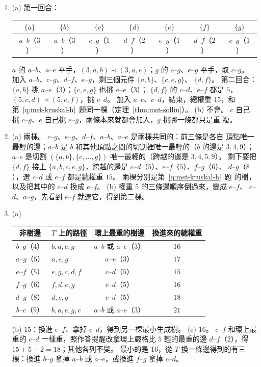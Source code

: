 \begin{enumerate}
\item (a) 第一回合：
\begin{center}
\small
\begin{tabular}{ccccccc}
\toprule
$\{a\}$ & $\{b\}$ & $\{c\}$ & $\{d\}$ & $\{e\}$ & $\{f\}$ & $\{g\}$ \\
\midrule
$a$--$b$（$3$） & $a$--$b$（$3$） & $c$--$g$（$1$） & $d$--$f$（$2$） & $e$--$g$（$1$） & $d$--$f$（$2$） &
$c$--$g$（$1$） \\
\bottomrule
\end{tabular}
\end{center}
$a$ 的 $a$--$b$、$a$--$e$ 平手，$(3, a, b) \prec (3, a, e)$；$g$ 的 $c$--$g$、$e$--$g$ 平手，取
$c$--$g$。 加入 $a$--$b$、$c$--$g$、$d$--$f$、$e$--$g$，剩三個元件 $\{a, b\}$、$\{c, e, g\}$、
$\{d, f\}$。 第二回合：$\{a, b\}$ 挑 $a$--$e$（$3$）；$\{c, e, g\}$ 也挑 $a$--$e$（$3$）；
$\{d, f\}$ 的 $c$--$d$、$e$--$f$ 都是 $5$，$(5, c, d) \prec (5, e, f)$，挑 $c$--$d$。 加入
$a$--$e$、$c$--$d$，結束，總權重 $15$，和第~\ref{q:mst-kruskal-h}~題同一棵（定理~\ref{thm:mst-sollin}）。
(b) 不會。 $c$ 自己挑 $c$--$g$、$e$ 自己挑 $e$--$g$，兩條本來就都會加入，$g$ 挑哪一條都只是重
複。

\item (a) 兩棵。 $c$--$g$、$e$--$g$、$d$--$f$、$a$--$b$、$a$--$e$ 是兩棵共同的：前三條是各自
頂點唯一最輕的邊；$a$--$b$ 是 $b$ 和其他頂點之間的切割裡唯一最輕的（$b$ 的邊是 $3, 4, 9$）；
$a$--$e$ 是切割 $(\{a, b\}, \{c, \ldots, g\})$ 唯一最輕的（跨越的邊是 $3, 4, 5, 9$）。 剩下要把
$\{d, f\}$ 接上 $\{a, b, c, e, g\}$，跨越的邊是 $c$--$d$（$5$）、$e$--$f$（$5$）、$f$--$g$（$6$）、
$d$--$g$（$8$），選 $c$--$d$ 或 $e$--$f$ 都是總權重 $15$。 兩棵分別是第~\ref{q:mst-kruskal-h}~題
的樹，以及把其中的 $c$--$d$ 換成 $e$--$f$。 (b) 權重 $5$ 的三條邊順序倒過來，變成 $e$--$f$、
$c$--$d$、$a$--$g$，先看到 $e$--$f$ 就選它，得到第二棵。

\item (a)
\begin{center}
\small
\begin{tabular}{clcc}
\toprule
非樹邊 & $T$ 上的路徑 & 環上最重的樹邊 & 換進來的總權重 \\
\midrule
$b$--$g$（$4$） & $b, a, e, g$ & $a$--$b$ 或 $a$--$e$（$3$） & $16$ \\
$a$--$g$（$5$） & $a, e, g$ & $a$--$e$（$3$） & $17$ \\
$e$--$f$（$5$） & $e, g, c, d, f$ & $c$--$d$（$5$） & $15$ \\
$f$--$g$（$6$） & $f, d, c, g$ & $c$--$d$（$5$） & $16$ \\
$d$--$g$（$8$） & $d, c, g$ & $c$--$d$（$5$） & $18$ \\
$b$--$c$（$9$） & $b, a, e, g, c$ & $a$--$b$ 或 $a$--$e$（$3$） & $21$ \\
\bottomrule
\end{tabular}
\end{center}
(b) $15$：換進 $e$--$f$、拿掉 $c$--$d$，得到另一棵最小生成樹。 (c) $16$。 $e$--$f$ 和環上最重的
$c$--$d$ 一樣重，照作答提醒改拿環上嚴格比 $5$ 輕的最重的邊 $d$--$f$（$2$），得 $15 + 5 - 2 =
18$；其他各列不變。 最小的是 $16$，從 $T$ 換一條邊得到的有三棵：換進 $b$--$g$ 拿掉 $a$--$b$ 或 $a$--$e$，或換進
$f$--$g$ 拿掉 $c$--$d$。


\end{enumerate}
